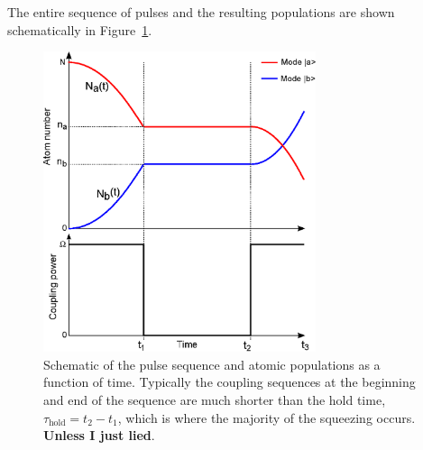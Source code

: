 \documentclass{iopart}
\begin{document}
The entire sequence of pulses and the resulting populations are shown schematically in Figure~\ref{figPulseScheme}.

\begin{figure}
    \centering
    \includegraphics[width=8cm]{figures/pulse_scheme.eps}
    \caption{Schematic of the pulse sequence and atomic populations as a function of time.  Typically the coupling sequences at the beginning and end of the sequence are much shorter than the hold time, $\tau_{\mathrm{hold}} = t_2 - t_1 $, which is where the majority of the squeezing occurs. \textbf{Unless I just lied}.}
    \label{figPulseScheme}
\end{figure}
\end{document}
